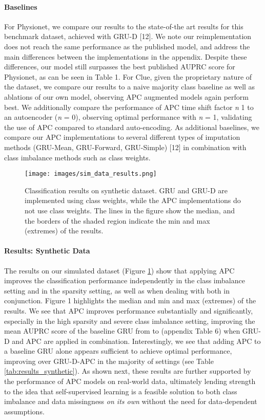 \documentclass{article}
\begin{document}
\paragraph{Baselines}
For Physionet, we compare our results to the state-of-the art results for this benchmark dataset, achieved with GRU-D [12].
We note our reimplementation does not reach the same performance as the published model, and address the main differences between the implementations in the appendix. Despite these differences, our model still surpasses the best published AUPRC score for Physionet, as can be seen in Table 1. For Clue, given the proprietary nature of the dataset, we compare our results to a naive majority class baseline as well as ablations of our own model, observing APC augmented models again perform best.  
We additionally compare the performance of APC time shift factor \textit{n}  1 to an autoencoder (\textit{n} = 0), observing optimal performance with \textit{n} = 1, validating the use of APC compared to standard auto-encoding. As additional baselines, we compare our APC implementations to several different types of imputation methods (GRU-Mean, GRU-Forward, GRU-Simple) [12] in combination with class imbalance methods such as class weights.

\begin{figure}[ht]
\vskip 0.05in
\begin{center}
\centerline{\texttt{[image: images/sim\_data\_results.png]}}
\caption{Classification results on synthetic dataset. GRU and GRU-D are implemented using class weights, while the APC implementations do not use class weights. The lines in the figure show the median, and the borders of the shaded region indicate the min and max (extremes) of the results.} 
\label{APC_sim_data}
\end{center}
\vskip -0.25in
\end{figure}

\paragraph{Results: Synthetic Data}
The results on our simulated dataset (Figure \ref{APC_sim_data}) show that applying APC improves the classification performance independently in the class imbalance setting and in the sparsity setting, as well as when dealing with both in conjunction.
Figure 1 highlights the median and min and max (extremes) of the results.
We see that APC improves performance substantially and significantly, especially in the high sparsity and severe class imbalance setting, improving the mean AUPRC score of the baseline GRU from  to  (appendix Table 6) when GRU-D and APC are applied in combination. Interestingly, we see that adding APC to a baseline GRU alone appears sufficient to achieve optimal performance, improving over GRU-D-APC in the majority of settings (see Table \ref{tab:results_synthetic}). As shown next, these results are further supported by the performance of APC models on real-world data, ultimately lending strength to the idea that self-supervised learning is a feasible solution to both class imbalance and data missingness \emph{on its own} without the need for data-dependent assumptions.
\end{document}
